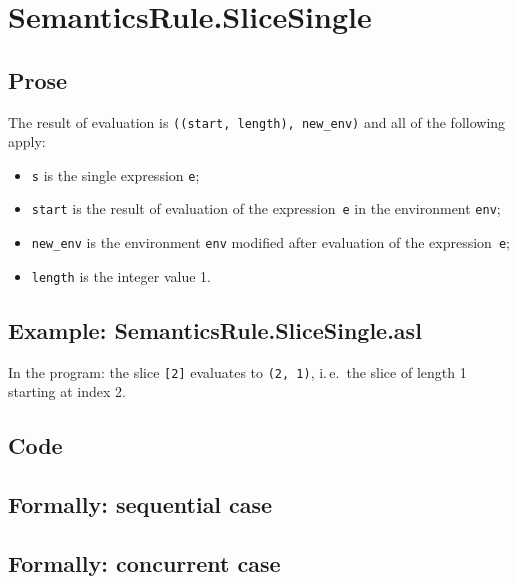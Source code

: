 \documentclass{book}
\begin{document}
\section{SemanticsRule.SliceSingle \label{sec:SemanticsRule.SliceSingle}}

  \subsection{Prose}
  The result of evaluation is \texttt{((start, length), new\_env)} and all
of the following apply:
  \begin{itemize}
    \item \texttt{s} is the single expression \texttt{e};
    \item \texttt{start} is the result of evaluation of the expression~\texttt{e}
      in the environment \texttt{env};
    \item \texttt{new\_env} is the environment \texttt{env} modified after
      evaluation of the expression~\texttt{e};
    \item \texttt{length} is the integer value 1.
  \end{itemize}

  \subsection{Example: SemanticsRule.SliceSingle.asl}
  In the program:
  the slice \texttt{[2]} evaluates to \texttt{(2, 1)}, i.\,e.\ the slice of
  length 1 starting at index 2.

  \subsection{Code}

\begin{emptyformal}
  \subsection{Formally: sequential case}

  \subsection{Formally: concurrent case}
\end{emptyformal}

\end{document}
